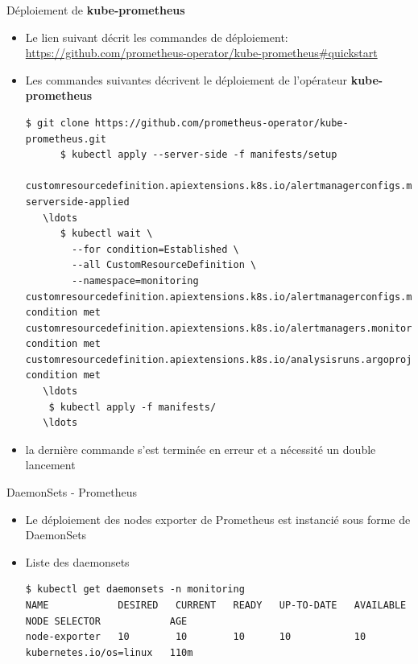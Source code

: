 \begin{frame}[fragile]{Déploiement de \textbf{kube-prometheus}}

\begin{itemize}
   \item Le lien suivant décrit les commandes de déploiement: \url{https://github.com/prometheus-operator/kube-prometheus#quickstart}
   \item Les commandes suivantes décrivent le déploiement de l'opérateur \textbf{kube-prometheus}
   \begin{tiny}
   \begin{Verbatim}[commandchars=\\\{\}]
      $ git clone https://github.com/prometheus-operator/kube-prometheus.git
      $ kubectl apply --server-side -f manifests/setup
   customresourcedefinition.apiextensions.k8s.io/alertmanagerconfigs.monitoring.coreos.com serverside-applied
   \ldots
      $ kubectl wait \
        --for condition=Established \
        --all CustomResourceDefinition \
        --namespace=monitoring
customresourcedefinition.apiextensions.k8s.io/alertmanagerconfigs.monitoring.coreos.com condition met
customresourcedefinition.apiextensions.k8s.io/alertmanagers.monitoring.coreos.com condition met
customresourcedefinition.apiextensions.k8s.io/analysisruns.argoproj.io condition met
   \ldots
    $ kubectl apply -f manifests/
   \ldots
   \end{Verbatim}
   \end{tiny}
\item la dernière commande s'est terminée en erreur et a nécessité un double lancement
\end{itemize}

\end{frame}


\begin{frame}[fragile]{DaemonSets - Prometheus}

   \begin{itemize}
      \item Le déploiement des nodes exporter de Prometheus est instancié sous forme de DaemonSets
      \item Liste des daemonsets
\begin{tiny}
\begin{Verbatim}[commandchars=\\\{\}]
$ kubectl get daemonsets -n monitoring
NAME            DESIRED   CURRENT   READY   UP-TO-DATE   AVAILABLE   NODE SELECTOR            AGE
node-exporter   10        10        10      10           10          kubernetes.io/os=linux   110m
\end{Verbatim}
\end{tiny}
   \end{itemize}

\end{frame}

